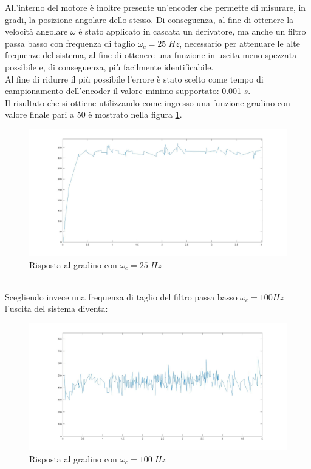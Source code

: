 All'interno del motore è inoltre presente un'encoder che permette di misurare, in gradi, la posizione angolare dello stesso.
Di conseguenza, al fine di ottenere la velocità angolare $\omega$ è stato applicato in cascata un derivatore, ma anche un filtro passa basso con frequenza di taglio $\omega_c=25\;Hz$, necessario per attenuare le alte frequenze del sistema, al fine di ottenere una funzione in uscita meno spezzata possibile e, di conseguenza, più facilmente identificabile.\\
Al fine di ridurre il più possibile l'errore è stato scelto come tempo di campionamento dell'encoder il valore minimo supportato: 0.001 $s$.\\
Il risultato che si ottiene utilizzando come ingresso una funzione gradino con valore finale pari a 50 è mostrato nella figura \ref{motore50StepCamp1000}.
\begin{figure}[ht]
	\centering
	\includegraphics[width=\textwidth]{motore50StepCamp1000.jpg}
	\caption{Risposta al gradino con $\omega_c=25\;Hz$}
	\label{motore50StepCamp1000}
\end{figure}
\\Scegliendo invece una frequenza di taglio del filtro passa basso $\omega_c = 100Hz$ l'uscita del sistema diventa:
\begin{figure}[ht]
	\centering
	\includegraphics[width=\textwidth]{motore50StepCamp1000Polo100.jpg}
	\caption{Risposta al gradino con $\omega_c=100\;Hz$ }
	\label{motore50StepCamp1000Polo100}
\end{figure}
